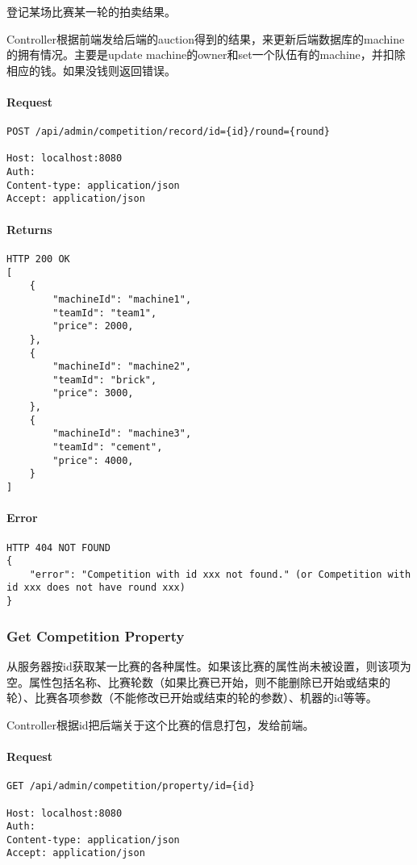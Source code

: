 \documentclass{article}
\begin{document}
登记某场比赛某一轮的拍卖结果。

Controller根据前端发给后端的auction得到的结果，来更新后端数据库的machine的拥有情况。主要是update machine的owner和set一个队伍有的machine，并扣除相应的钱。如果没钱则返回错误。

\paragraph*{Request}
\begin{lstlisting}
POST /api/admin/competition/record/id={id}/round={round}

Host: localhost:8080
Auth:
Content-type: application/json
Accept: application/json
\end{lstlisting}

\paragraph*{Returns}
\begin{lstlisting}
HTTP 200 OK
[
    {
        "machineId": "machine1",
        "teamId": "team1",
        "price": 2000,
    },
    {
        "machineId": "machine2",
        "teamId": "brick",
        "price": 3000,
    },
    {
        "machineId": "machine3",
        "teamId": "cement",
        "price": 4000,
    }
]
\end{lstlisting}

\paragraph*{Error}
\begin{lstlisting}
HTTP 404 NOT FOUND
{
    "error": "Competition with id xxx not found." (or Competition with id xxx does not have round xxx)
}
\end{lstlisting}


\subsubsection{Get Competition Property}

从服务器按id获取某一比赛的各种属性。如果该比赛的属性尚未被设置，则该项为空。属性包括名称、比赛轮数（如果比赛已开始，则不能删除已开始或结束的轮）、比赛各项参数（不能修改已开始或结束的轮的参数）、机器的id等等。

Controller根据id把后端关于这个比赛的信息打包，发给前端。

\paragraph*{Request}
\begin{lstlisting}
GET /api/admin/competition/property/id={id}

Host: localhost:8080
Auth:
Content-type: application/json
Accept: application/json
\end{lstlisting}
\end{document}
